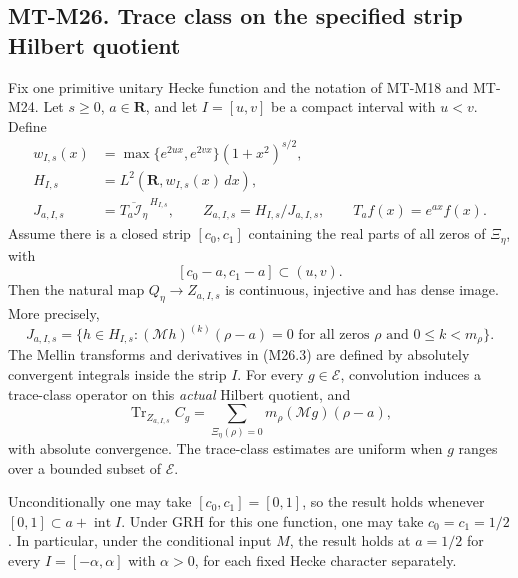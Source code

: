 \documentclass[11pt,a4paper]{article}
\begin{document}
\subsection*{MT-M26. Trace class on the specified strip Hilbert quotient}
Fix one primitive unitary Hecke function and the notation of
MT-M18 and MT-M24. Let $s\ge0$, $a\in\mathbf R$, and let
$I=[u,v]$ be a compact interval with $u<v$. Define
\[
 \begin{split}
 w_{I,s}(x)&=\max\{e^{2ux},e^{2vx}\}(1+x^2)^{s/2},\\
 H_{I,s}&=L^2(\mathbf R,w_{I,s}(x)\,dx),\\
 J_{a,I,s}&=\overline{T_a\mathcal I_\eta}^{\,H_{I,s}},
 \qquad Z_{a,I,s}=H_{I,s}/J_{a,I,s},
 \qquad T_af(x)=e^{ax}f(x).
 \end{split}                                                    \tag{M26.1}
\]
Assume there is a closed strip $[c_0,c_1]$ containing the real
parts of all zeros of $\Xi_\eta$, with
\[
                 [c_0-a,c_1-a]\subset(u,v).
                                                               \tag{M26.2}
\]
Then the natural map $Q_\eta\to Z_{a,I,s}$ is continuous,
injective and has dense image. More precisely,
\[
 J_{a,I,s}
 =\{h\in H_{I,s}:(\mathcal Mh)^{(k)}(\rho-a)=0
       \text{ for all zeros }\rho\text{ and }0\le k<m_\rho\}.
                                                               \tag{M26.3}
\]
The Mellin transforms and derivatives in (M26.3) are defined
by absolutely convergent integrals inside the strip $I$.
For every $g\in\mathcal E$, convolution induces a trace-class
operator on this \emph{actual} Hilbert quotient, and
\[
       \operatorname{Tr}_{Z_{a,I,s}}C_g
          =\sum_{\Xi_\eta(\rho)=0}
                        m_\rho(\mathcal Mg)(\rho-a),
                                                               \tag{M26.4}
\]
with absolute convergence. The trace-class estimates are
uniform when $g$ ranges over a bounded subset of $\mathcal E$.

Unconditionally one may take $[c_0,c_1]=[0,1]$, so the result
holds whenever $[0,1]\subset a+\operatorname{int}I$.
Under GRH for this one function, one may take $c_0=c_1=1/2$.
In particular, under the conditional input $M$, the result
holds at $a=1/2$ for every $I=[-\alpha,\alpha]$ with
$\alpha>0$, for each fixed Hecke character separately.
\end{document}
